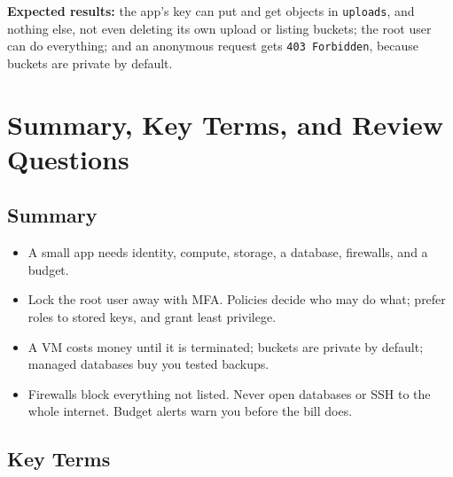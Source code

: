 \begin{enumerate}
  \begin{codeblock}

\begin{Shaded}
\begin{Highlighting}[]
\KeywordTok{\&\&} \KeywordTok{\&\&} 
\end{Highlighting}
\end{Shaded}

  \end{codeblock}
\end{enumerate}

\textbf{Expected results:} the app's key can put and get objects in \texttt{uploads}, and nothing else, not even deleting its own upload or listing buckets; the root user can do everything; and an anonymous request gets \texttt{403\ Forbidden}, because buckets are private by default.

\section{Summary, Key Terms, and Review Questions}\label{07-cloud-building-blocks:summary-key-terms-and-review-questions}

\subsection*{Summary}\label{07-cloud-building-blocks:summary}

\begin{itemize}
\tightlist
\item
  A small app needs identity, compute, storage, a database, firewalls, and a budget.
\item
  Lock the root user away with MFA. Policies decide who may do what; prefer roles to stored keys, and grant least privilege.
\item
  A VM costs money until it is terminated; buckets are private by default; managed databases buy you tested backups.
\item
  Firewalls block everything not listed. Never open databases or SSH to the whole internet. Budget alerts warn you before the bill does.
\end{itemize}


\subsection*{Key Terms}\label{07-cloud-building-blocks:key-terms}

